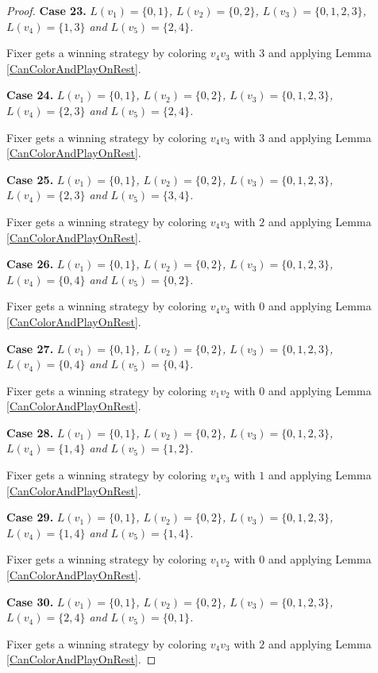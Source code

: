 \documentclass[12pt]{amsart}
\theoremstyle{plain}
\theoremstyle{definition}
\theoremstyle{remark}
\begin{document}
\begin{proof}
\noindent\textbf{Case 23.  }\textit{$L(v_1) = \{0, 1\}$, $L(v_2) = \{0, 2\}$, $L(v_3) = \{0, 1, 2, 3\}$, $L(v_4) = \{1, 3\}$ and $L(v_5) = \{2, 4\}$.}

Fixer gets a winning strategy by coloring $v_4v_3$ with $3$ and applying Lemma \ref{CanColorAndPlayOnRest}.

\noindent\textbf{Case 24.  }\textit{$L(v_1) = \{0, 1\}$, $L(v_2) = \{0, 2\}$, $L(v_3) = \{0, 1, 2, 3\}$, $L(v_4) = \{2, 3\}$ and $L(v_5) = \{2, 4\}$.}

Fixer gets a winning strategy by coloring $v_4v_3$ with $3$ and applying Lemma \ref{CanColorAndPlayOnRest}.

\noindent\textbf{Case 25.  }\textit{$L(v_1) = \{0, 1\}$, $L(v_2) = \{0, 2\}$, $L(v_3) = \{0, 1, 2, 3\}$, $L(v_4) = \{2, 3\}$ and $L(v_5) = \{3, 4\}$.}

Fixer gets a winning strategy by coloring $v_4v_3$ with $2$ and applying Lemma \ref{CanColorAndPlayOnRest}.

\noindent\textbf{Case 26.  }\textit{$L(v_1) = \{0, 1\}$, $L(v_2) = \{0, 2\}$, $L(v_3) = \{0, 1, 2, 3\}$, $L(v_4) = \{0, 4\}$ and $L(v_5) = \{0, 2\}$.}

Fixer gets a winning strategy by coloring $v_4v_3$ with $0$ and applying Lemma \ref{CanColorAndPlayOnRest}.

\noindent\textbf{Case 27.  }\textit{$L(v_1) = \{0, 1\}$, $L(v_2) = \{0, 2\}$, $L(v_3) = \{0, 1, 2, 3\}$, $L(v_4) = \{0, 4\}$ and $L(v_5) = \{0, 4\}$.}

Fixer gets a winning strategy by coloring $v_1v_2$ with $0$ and applying Lemma \ref{CanColorAndPlayOnRest}.

\noindent\textbf{Case 28.  }\textit{$L(v_1) = \{0, 1\}$, $L(v_2) = \{0, 2\}$, $L(v_3) = \{0, 1, 2, 3\}$, $L(v_4) = \{1, 4\}$ and $L(v_5) = \{1, 2\}$.}

Fixer gets a winning strategy by coloring $v_4v_3$ with $1$ and applying Lemma \ref{CanColorAndPlayOnRest}.

\noindent\textbf{Case 29.  }\textit{$L(v_1) = \{0, 1\}$, $L(v_2) = \{0, 2\}$, $L(v_3) = \{0, 1, 2, 3\}$, $L(v_4) = \{1, 4\}$ and $L(v_5) = \{1, 4\}$.}

Fixer gets a winning strategy by coloring $v_1v_2$ with $0$ and applying Lemma \ref{CanColorAndPlayOnRest}.

\noindent\textbf{Case 30.  }\textit{$L(v_1) = \{0, 1\}$, $L(v_2) = \{0, 2\}$, $L(v_3) = \{0, 1, 2, 3\}$, $L(v_4) = \{2, 4\}$ and $L(v_5) = \{0, 1\}$.}

Fixer gets a winning strategy by coloring $v_4v_3$ with $2$ and applying Lemma \ref{CanColorAndPlayOnRest}.


\end{proof}
\end{document}

